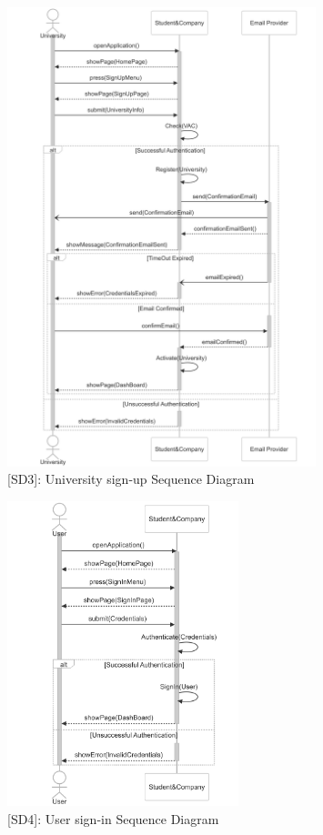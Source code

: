 \begin{figure}
    \centering
    \includegraphics[width=0.8\textwidth]{Latex/Images/UniversitySignUpSequenceDiagram.png}
    \caption{[SD3]: University sign-up Sequence Diagram}
    \label{fig:SD3}
\end{figure}
\clearpage

\begin{figure}
    \centering
    \includegraphics[width=0.6\textwidth]{Latex/Images/UserSignInSequenceDiagram.png}
    \caption{[SD4]: User sign-in Sequence Diagram}
    \label{fig:SD4}
\end{figure}
\clearpage

